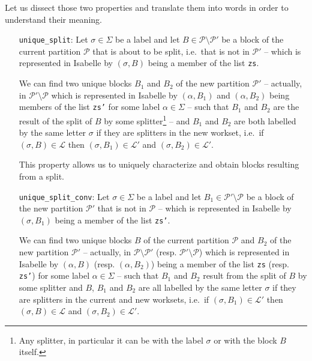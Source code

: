 \documentclass[12pt, a4 paper]{article}
\theoremstyle{definition}
\begin{document}
Let us dissect those two properties and translate them into words in order to understand their meaning.
\begin{itemize}
    \item[\texttt{unique\_split}:] Let $\sigma \in \Sigma$ be a label and let $B \in \mathcal{P} \setminus \mathcal{P'}$ be a block of the current partition $\mathcal{P}$ that is about to be split, i.e.\ that is not in $\mathcal{P'}$ -- which is represented in Isabelle by $(\sigma, B)$ being a member of the list \texttt{zs}.
    
    We can find two unique blocks $B_1$ and $B_2$ of the new partition $\mathcal{P'}$ -- actually, in $\mathcal{P'} \setminus \mathcal{P}$ which is represented in Isabelle by $(\alpha, B_1)$ and $(\alpha, B_2)$ being members of the list \texttt{zs'} for some label $\alpha \in \Sigma$ -- such that $B_1$ and $B_2$ are the result of the split of $B$ by some splitter\footnote{Any splitter, in particular it can be with the label $\sigma$ or with the block $B$ itself.} -- and $B_1$ and $B_2$ are both labelled by the same letter $\sigma$ if they are splitters in the new workset, i.e.\ if $(\sigma, B) \in \mathcal{L}$ then $(\sigma, B_1) \in \mathcal{L}'$ and $(\sigma, B_2) \in \mathcal{L}'$.

    This property allows us to uniquely characterize and obtain blocks resulting from a split.

    \item[\texttt{unique\_split\_conv}:] Let $\sigma \in \Sigma$ be a label and let $B_1 \in \mathcal{P'} \setminus \mathcal{P}$ be a block of the new partition $\mathcal{P'}$ that is not in $\mathcal{P}$ -- which is represented in Isabelle by $(\sigma, B_1)$ being a member of the list \texttt{zs'}.

    We can find two unique blocks $B$ of the current partition $\mathcal{P}$ and $B_2$ of the new partition $\mathcal{P'}$ -- actually, in $\mathcal{P} \setminus \mathcal{P'}$ (resp. $\mathcal{P'} \setminus \mathcal{P}$) which is represented in Isabelle by $(\alpha, B)$ (resp. $(\alpha, B_2)$) being a member of the list \texttt{zs} (resp. \texttt{zs'}) for some label $\alpha \in \Sigma$ -- such that $B_1$ and $B_2$ result from the split of $B$ by some splitter and $B$, $B_1$ and $B_2$ are all labelled by the same letter $\sigma$ if they are splitters in the current and new worksets, i.e.\ if $(\sigma, B_1) \in \mathcal{L}'$ then $(\sigma, B) \in \mathcal{L}$ and $(\sigma, B_2) \in \mathcal{L}'$.
\end{itemize}
\end{document}

